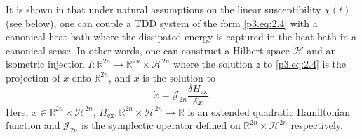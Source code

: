 It is shown in \cite{figotin2007hamiltonian,figotin2005spectral} that under natural assumptions on the linear susceptibility $\chi(t)$ (see below), one can couple a TDD system of the form \eqref{p3.eq:2.4} with a canonical heat bath where the dissipated energy is captured in the heat bath in a canonical sense. In other words, one can construct a Hilbert space $\mathcal H$ and an isometric injection $I:\mathbb R^{2n} \to \mathbb R^{2n}\times \mathcal H^{2n}$ where the solution $z$ to \eqref{p3.eq:2.4} is the projection of $x$ onto $\mathbb R^{2n}$, and $x$ is the solution to
\begin{equation} \label{p3.eq:2.7}
	\dot x = \mathcal J_{2n} \frac{\delta H_{\text{ex}}}{\delta x}.
\end{equation}
Here, $x\in \mathbb R^{2n}\times \mathcal H^{2n} $, $H_{\text{ex}}:\mathbb R^{2n}\times \mathcal H^{2n} \to \mathbb R$ is an extended quadratic Hamiltonian function and $\mathcal J_{2n}$ is the symplectic operator defined on $\mathbb R^{2n}\times \mathcal H^{2n}$ respectively.


